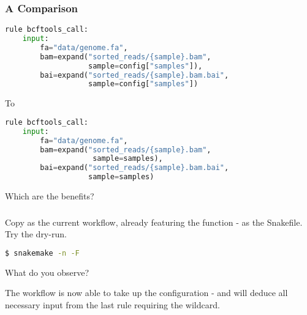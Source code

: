 \begin{frame}[fragile]
  \frametitle{A Comparison}
  \begin{lstlisting}[language=Python,style=Python,basicstyle=\footnotesize]
rule bcftools_call:
    input:
        fa="data/genome.fa",
        bam=expand("sorted_reads/{sample}.bam",
                   sample=config["samples"]),
        bai=expand("sorted_reads/{sample}.bam.bai",
                   sample=config["samples"])
  \end{lstlisting}
  To
  \begin{lstlisting}[language=Python,style=Python,basicstyle=\footnotesize]
rule bcftools_call:
    input:
        fa="data/genome.fa",
        bam=expand("sorted_reads/{sample}.bam",
                    sample=samples),
        bai=expand("sorted_reads/{sample}.bam.bai",
                   sample=samples)
  \end{lstlisting}
  \bcquestion Which are the benefits?
\end{frame}


\begin{frame}[fragile]
  \frametitle{}
  \begin{task}\footnotesize
  	 Copy  as the current workflow, already featuring the  function - as the Snakefile.\newline
  	 Try the dry-run.
  	 \begin{lstlisting}[language=Bash, style=Shell]
$ snakemake -n -F
  	 \end{lstlisting}
  \end{task}
  \begin{question}
  	What do you observe? 
  \end{question}
  \pause
  \begin{hint}
  	The workflow is now able to take up the configuration - and will deduce all necessary input from the last rule requiring the  wildcard.
  \end{hint}
\end{frame}


